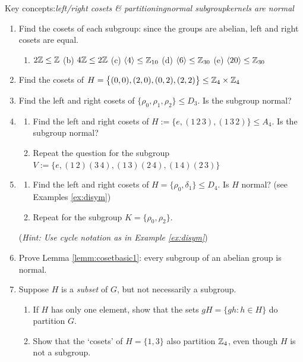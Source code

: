 \goodbreak


\begin{exercises}{}{}
	Key concepts:\quad \emph{left/right cosets \& partitioning\quad normal subgroup\quad kernels are normal}

	\begin{enumerate}
	  \item Find the cosets of each subgroup: since the groups are abelian, left and right cosets are equal.
		\begin{enumerate}
	  	\item $2\mathbb{Z}\le\mathbb{Z}$\qquad\quad
	  	(b) $4\mathbb{Z}\le 2\mathbb{Z}$\qquad\quad
		  (c) $\left\langle 4\right\rangle\le\mathbb{Z}_{10}$\qquad\quad
		  (d) $\left\langle 6\right\rangle\le\mathbb{Z}_{30}$\qquad\quad
		  (e) $\left\langle 20\right\rangle\le\mathbb{Z}_{30}$
		\end{enumerate}
			
			
		\item\label{exs:VfactorV} Find the cosets of $H=\bigl\{(0,0),(2,0),(0,2),(2,2)\bigr\}\le\mathbb{Z}_4\times\mathbb{Z}_4$
			
			
		\item Find the left and right cosets of $\{\rho_0,\rho_1,\rho_2\}\le D_3$. Is the subgroup normal?
		
		
		\item\label{exs:va4}\begin{enumerate}
		  \item Find the left and right cosets of $H:=\{e,(1\,2\,3),(1\,3\,2)\}\le A_4$. Is the subgroup normal?
		  \item Repeat the question for the subgroup $V:=\{e,(1\,2)(3\,4),(1\,3)(2\,4),(1\,4)(2\,3)\}$
		\end{enumerate}
		
	
		\item\label{exs:d4normal}\begin{enumerate}
		  \item Find the left and right cosets of $H=\{\rho_0,\delta_1\}\le D_4$. Is $H$ normal? (see Examples \ref{ex:disym})
			\item Repeat for the subgroup $K=\{\rho_0,\rho_2\}$.
		\end{enumerate}
		(\emph{Hint: Use cycle notation as in Example \ref{ex:disym}})
	  
	  
	  \item Prove Lemma \ref{lemm:cosetbasic1}: every subgroup of an abelian group is normal.
	  
	  
	  \item\label{exs:partitioncoset} Suppose $H$ is a \emph{subset} of $G$, but not necessarily a subgroup.
	  \begin{enumerate}
	    \item If $H$ has only one element, show that the sets $gH=\{gh:h\in H\}$ do partition $G$.
	    \item Show that the `cosets' of $H=\{1,3\}$ also partition $\mathbb{Z}_4$, even though $H$ is not a subgroup.
	  \end{enumerate}
	  

\end{enumerate}
\end{exercises}

